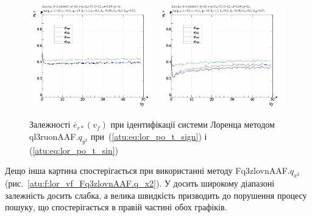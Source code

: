 \begin{figure}[ht!]
  \centerline{
    \includegraphics[width=0.49\textwidth]{p/cha/lor/ql3ruonAAF/lor_ql3ruonAAF_qy2-p_v_f_e_sign.png}
    \hfill
    \includegraphics[width=0.49\textwidth]{p/cha/lor/ql3ruonAAF/lor_ql3ruonAAF_qy2-p_v_f_e_sin.png}
  }
\caption{Залежності $ \overline{e}_{r *} (v_f) $ при ідентифікації системи Лоренца методом ql3ruonAAF.$q_{y^2} $ при~(\ref{atu:eq:lor_po_t_sign}) і (\ref{atu:eq:lor_po_t_sin})}
\label{atu:f:lor_vf_ql3ruonAAF.q_y2}
\end{figure}

Дещо інша картина спостерігається при використанні методу
Fq3zlovnAAF.$q_{x^2}$
(рис.~\ref{atu:f:lor_vf_Fq3zlovnAAF.q_x2}).
У досить широкому діапазоні залежність досить слабка, а
велика швидкість призводить до порушення процесу пошуку, що
спостерігається в правій частині обох графіків.

